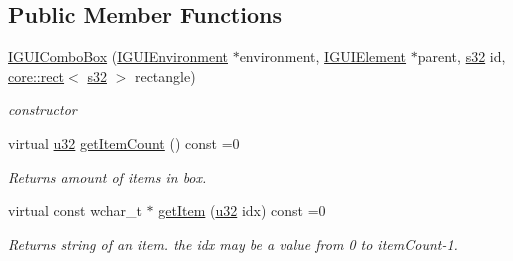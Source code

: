 \subsection*{Public Member Functions}
\begin{DoxyCompactItemize}
\item 
\mbox{\label{classirr_1_1gui_1_1IGUIComboBox_a89e96a8ac4c47e7b202be120486f1f94}} 
\hyperlink{classirr_1_1gui_1_1IGUIComboBox_a89e96a8ac4c47e7b202be120486f1f94}{I\+G\+U\+I\+Combo\+Box} (\hyperlink{classirr_1_1gui_1_1IGUIEnvironment}{I\+G\+U\+I\+Environment} $\ast$environment, \hyperlink{classirr_1_1gui_1_1IGUIElement}{I\+G\+U\+I\+Element} $\ast$parent, \hyperlink{namespaceirr_ac66849b7a6ed16e30ebede579f9b47c6}{s32} id, \hyperlink{classirr_1_1core_1_1rect}{core\+::rect}$<$ \hyperlink{namespaceirr_ac66849b7a6ed16e30ebede579f9b47c6}{s32} $>$ rectangle)
\begin{DoxyCompactList}\small\item\em constructor \end{DoxyCompactList}\item 
\mbox{\label{classirr_1_1gui_1_1IGUIComboBox_a573bdf5507fd9d389635cbb4d84c3757}} 
virtual \hyperlink{namespaceirr_a0416a53257075833e7002efd0a18e804}{u32} \hyperlink{classirr_1_1gui_1_1IGUIComboBox_a573bdf5507fd9d389635cbb4d84c3757}{get\+Item\+Count} () const =0
\begin{DoxyCompactList}\small\item\em Returns amount of items in box. \end{DoxyCompactList}\item 
\mbox{\label{classirr_1_1gui_1_1IGUIComboBox_afe60f75b5e8685f6a19101d31ad6d369}} 
virtual const wchar\+\_\+t $\ast$ \hyperlink{classirr_1_1gui_1_1IGUIComboBox_afe60f75b5e8685f6a19101d31ad6d369}{get\+Item} (\hyperlink{namespaceirr_a0416a53257075833e7002efd0a18e804}{u32} idx) const =0
\begin{DoxyCompactList}\small\item\em Returns string of an item. the idx may be a value from 0 to item\+Count-\/1. \end{DoxyCompactList}\item 
\mbox{\label{classirr_1_1gui_1_1IGUIComboBox_ac0f2189cf87e4ffe38834edea01c75fb}} 

\end{DoxyCompactItemize}
